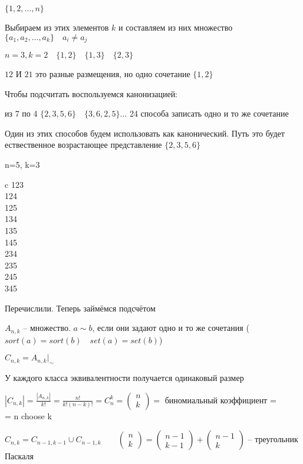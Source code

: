 \documentclass{book}
\theoremstyle{definition}
\begin{document}
$\{1, 2, \ldots, n\}$

Выбираем из этих элементов $k$ и составляем из них множество  $\{a_1, a_2, \ldots, a_k\}\quad a_i\neq a_j$

$n=3, k=2\quad \{1, 2\}\quad\{1,3\}\quad\{2,3\}$

$12$ И  $21$ это разные размещения, но одно сочетание  $\{1,2\}$

Чтобы подсчитать воспользуемся канонизацией:

из 7 по 4  $\{2,3,5,6\}\quad \{3,6,2,5\} \ldots$ 24 способа записать одно и то же сочетание

Один из этих способов будем использовать как канонический. Путь это будет ествественное возрастающее представление $\{2,3,5,6\}$

n=5, k=3
\begin{taular}{c}
    123\\124\\125\\134\\135\\145\\234\\235\\245\\345\\
\end{taular}

Перечислили. Теперь займёмся подсчётом

$A_{n, k}$ -- множество.  $a\sim b$, если они задают одно и то же сочетания ($sort(a) = sort(b)\quad set(a) = set(b) $)

$C_{n, k} = A_{n, k}|_{\sim }$ 

У каждого класса эквивалентности получается одинаковый размер 

$\left| C_{n, k} \right|  = \frac{\left| A_{n, k} \right| }{k!} = \frac{n!}{k!(n-k)!} = C_n^k = \begin{pmatrix} n\\k \end{pmatrix} =$ биномиальный коэффициент =\\= n choose k


$C_{n, k} = C_{n-1, k-1} \cup  C_{n-1, k}\qquad \begin{pmatrix} n\\k \end{pmatrix}  = \begin{pmatrix}n-1\\k-1  \end{pmatrix}  + \begin{pmatrix} n-1\\k \end{pmatrix} $ -- треугольник Паскаля
\end{document}
